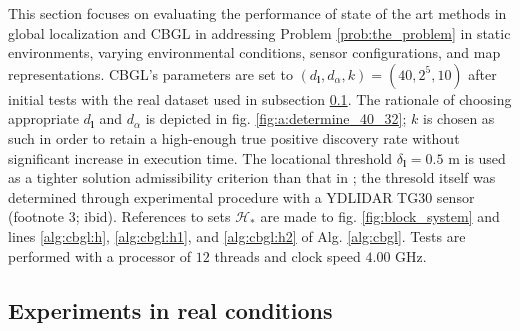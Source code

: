 This section focuses on evaluating the performance of state of the art methods
in global localization and CBGL in addressing Problem \ref{prob:the_problem} in
static environments, varying environmental
conditions, sensor configurations, and map representations. CBGL's
parameters are set to $(d_{\bm{l}},d_{\alpha},k) = (40, 2^5, 10)$
after initial tests with the real dataset used in subsection
\ref{subsec:exp_a}. The rationale of choosing appropriate
$d_{\bm{l}}$ and $d_{\alpha}$ is depicted in fig. \ref{fig:a:determine_40_32};
$k$ is chosen as such in order to retain a high-enough true positive discovery
rate without significant increase in execution time. The locational threshold
$\delta_{\bm{l}} = 0.5$ m is used as a tighter solution admissibility criterion
than that in \cite{Filotheou2022g}; the thresold itself was
determined through experimental procedure with a YDLIDAR TG30 sensor (footnote
3; ibid).
References to sets $\mathcal{H}_{\ast}$ are made to fig. \ref{fig:block_system}
and lines
\ref{alg:cbgl:h}, \ref{alg:cbgl:h1}, and \ref{alg:cbgl:h2} of
Alg.  \ref{alg:cbgl}.
Tests are performed with a processor of $12$ threads and clock speed $4.00$ GHz.


\subsection{Experiments in real conditions}
\label{subsec:exp_a}

